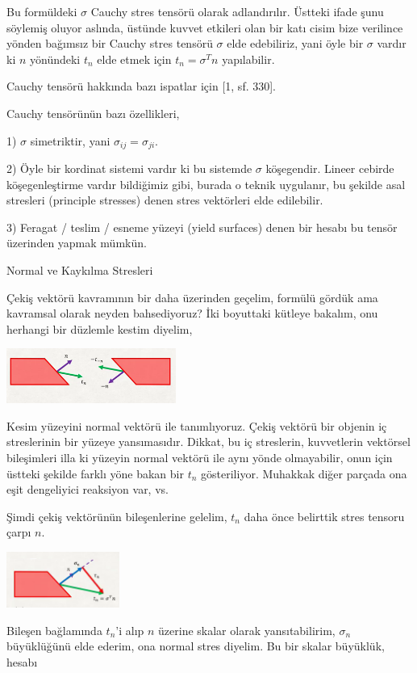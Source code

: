 \documentclass[12pt,fleqn]{article}\usepackage{../../common}
\begin{document}
Bu formüldeki $\sigma$ Cauchy stres tensörü olarak adlandırılır. Üstteki ifade
şunu söylemiş oluyor aslında, üstünde kuvvet etkileri olan bir katı cisim bize
verilince yönden bağımsız bir Cauchy stres tensörü $\sigma$ elde edebiliriz,
yani öyle bir $\sigma$ vardır ki $n$ yönündeki $t_n$ elde etmek için
$t_n = \sigma^T n$ yapılabilir.

Cauchy tensörü hakkında bazı ispatlar için [1, sf. 330]. 

Cauchy tensörünün bazı özellikleri,

1) $\sigma$ simetriktir, yani $\sigma_{ij} = \sigma_{ji}$.

2) Öyle bir kordinat sistemi vardır ki bu sistemde $\sigma$ köşegendir. Lineer
cebirde köşegenleştirme vardır bildiğimiz gibi, burada o teknik uygulanır, bu
şekilde asal stresleri (principle stresses) denen stres vektörleri elde
edilebilir.

3) Feragat / teslim / esneme yüzeyi (yield surfaces) denen bir hesabı bu tensör
üzerinden yapmak mümkün. 

Normal ve Kaykılma Stresleri

Çekiş vektörü kavramının bir daha üzerinden geçelim, formülü gördük ama
kavramsal olarak neyden bahsediyoruz? İki boyuttaki kütleye bakalım, onu
herhangi bir düzlemle kestim diyelim, 

\includegraphics[width=15em]{phy_020_strs_02_06.png}

Kesim yüzeyini normal vektörü ile tanımlıyoruz. Çekiş vektörü bir objenin iç
streslerinin bir yüzeye yansımasıdır. Dikkat, bu iç streslerin, kuvvetlerin
vektörsel bileşimleri illa ki yüzeyin normal vektörü ile aynı yönde olmayabilir,
onun için üstteki şekilde farklı yöne bakan bir $t_n$ gösteriliyor. Muhakkak
diğer parçada ona eşit dengeliyici reaksiyon var, vs.

Şimdi çekiş vektörünün bileşenlerine gelelim, $t_n$ daha önce belirttik stres
tensoru çarpı $n$. 

\includegraphics[width=10em]{phy_020_strs_02_07.png}

Bileşen bağlamında $t_n$'i alıp $n$ üzerine skalar olarak yansıtabilirim,
$\sigma_n$ büyüklüğünü elde ederim, ona normal stres diyelim. Bu bir skalar
büyüklük, hesabı
\end{document}
